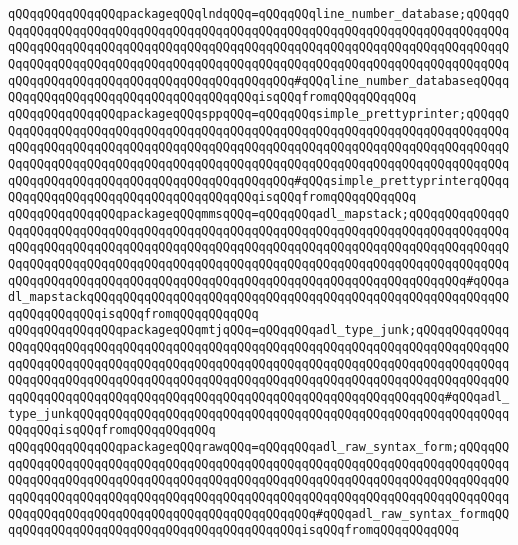 \verb|qQQqqQQqqQQqqQQqpackageqQQqlndqQQq=qQQqqQQqline_number_database;qQQqqQQqqQQqqQQqqQQqqQQqqQQqqQQqqQQqqQQqqQQqqQQqqQQqqQQqqQQqqQQqqQQqqQQqqQQqqQQqqQQqqQQqqQQqqQQqqQQqqQQqqQQqqQQqqQQqqQQqqQQqqQQqqQQqqQQqqQQqqQQqqQQqqQQqqQQqqQQqqQQqqQQqqQQqqQQqqQQqqQQqqQQqqQQqqQQqqQQqqQQqqQQqqQQqqQQqqQQqqQQqqQQqqQQqqQQqqQQqqQQqqQQqqQQqqQQq#qQQqline_number_databaseqQQqqQQqqQQqqQQqqQQqqQQqqQQqqQQqqQQqqQQqisqQQqfromqQQqqQQqqQQq|\newline
\verb|qQQqqQQqqQQqqQQqpackageqQQqsppqQQq=qQQqqQQqsimple_prettyprinter;qQQqqQQqqQQqqQQqqQQqqQQqqQQqqQQqqQQqqQQqqQQqqQQqqQQqqQQqqQQqqQQqqQQqqQQqqQQqqQQqqQQqqQQqqQQqqQQqqQQqqQQqqQQqqQQqqQQqqQQqqQQqqQQqqQQqqQQqqQQqqQQqqQQqqQQqqQQqqQQqqQQqqQQqqQQqqQQqqQQqqQQqqQQqqQQqqQQqqQQqqQQqqQQqqQQqqQQqqQQqqQQqqQQqqQQqqQQqqQQqqQQqqQQqqQQqqQQq#qQQqsimple_prettyprinterqQQqqQQqqQQqqQQqqQQqqQQqqQQqqQQqqQQqqQQqisqQQqfromqQQqqQQqqQQq|\newline
\verb|qQQqqQQqqQQqqQQqpackageqQQqmmsqQQq=qQQqqQQqadl_mapstack;qQQqqQQqqQQqqQQqqQQqqQQqqQQqqQQqqQQqqQQqqQQqqQQqqQQqqQQqqQQqqQQqqQQqqQQqqQQqqQQqqQQqqQQqqQQqqQQqqQQqqQQqqQQqqQQqqQQqqQQqqQQqqQQqqQQqqQQqqQQqqQQqqQQqqQQqqQQqqQQqqQQqqQQqqQQqqQQqqQQqqQQqqQQqqQQqqQQqqQQqqQQqqQQqqQQqqQQqqQQqqQQqqQQqqQQqqQQqqQQqqQQqqQQqqQQqqQQqqQQqqQQqqQQqqQQqqQQqqQQqqQQqqQQq#qQQqadl_mapstackqQQqqQQqqQQqqQQqqQQqqQQqqQQqqQQqqQQqqQQqqQQqqQQqqQQqqQQqqQQqqQQqqQQqqQQqisqQQqfromqQQqqQQqqQQq|\newline
\verb|qQQqqQQqqQQqqQQqpackageqQQqmtjqQQq=qQQqqQQqadl_type_junk;qQQqqQQqqQQqqQQqqQQqqQQqqQQqqQQqqQQqqQQqqQQqqQQqqQQqqQQqqQQqqQQqqQQqqQQqqQQqqQQqqQQqqQQqqQQqqQQqqQQqqQQqqQQqqQQqqQQqqQQqqQQqqQQqqQQqqQQqqQQqqQQqqQQqqQQqqQQqqQQqqQQqqQQqqQQqqQQqqQQqqQQqqQQqqQQqqQQqqQQqqQQqqQQqqQQqqQQqqQQqqQQqqQQqqQQqqQQqqQQqqQQqqQQqqQQqqQQqqQQqqQQqqQQqqQQqqQQqqQQqqQQq#qQQqadl_type_junkqQQqqQQqqQQqqQQqqQQqqQQqqQQqqQQqqQQqqQQqqQQqqQQqqQQqqQQqqQQqqQQqqQQqisqQQqfromqQQqqQQqqQQq|\newline
\verb|qQQqqQQqqQQqqQQqpackageqQQqrawqQQq=qQQqqQQqadl_raw_syntax_form;qQQqqQQqqQQqqQQqqQQqqQQqqQQqqQQqqQQqqQQqqQQqqQQqqQQqqQQqqQQqqQQqqQQqqQQqqQQqqQQqqQQqqQQqqQQqqQQqqQQqqQQqqQQqqQQqqQQqqQQqqQQqqQQqqQQqqQQqqQQqqQQqqQQqqQQqqQQqqQQqqQQqqQQqqQQqqQQqqQQqqQQqqQQqqQQqqQQqqQQqqQQqqQQqqQQqqQQqqQQqqQQqqQQqqQQqqQQqqQQqqQQqqQQqqQQqqQQqqQQq#qQQqadl_raw_syntax_formqQQqqQQqqQQqqQQqqQQqqQQqqQQqqQQqqQQqqQQqqQQqisqQQqfromqQQqqQQqqQQq|\newline
